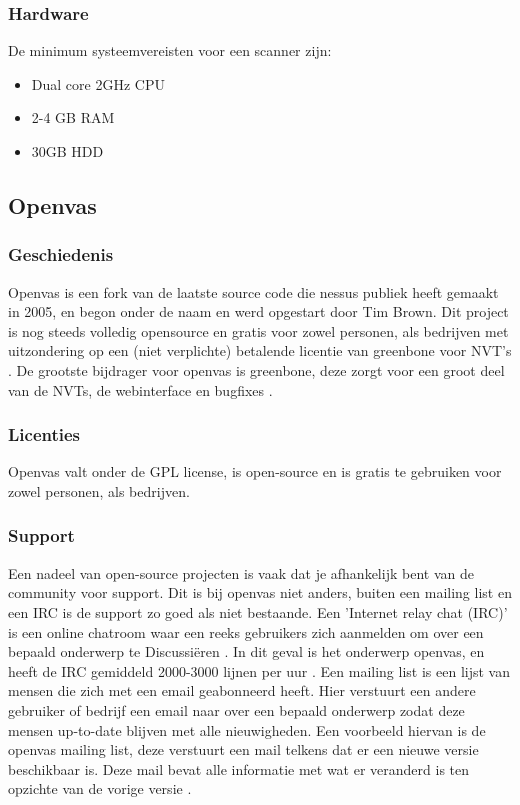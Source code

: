 \subsubsection{Hardware}
De minimum systeemvereisten voor een scanner zijn:

\begin{itemize}
\item Dual core 2GHz CPU
\item 2-4 GB RAM
\item 30GB HDD
\end{itemize}

\textcite{Nessus-requirements}


\subsection{Openvas}

\subsubsection{Geschiedenis}
Openvas is een fork van de laatste source code die nessus publiek heeft gemaakt in 2005, en begon onder de naam \textcite{Securiteam} en werd opgestart door Tim Brown. Dit project is nog steeds volledig opensource \textcite{Openvas-source} en gratis voor zowel personen, als bedrijven met uitzondering op een (niet verplichte) betalende licentie van greenbone voor NVT's \textcite{Openvas-nvt}. De grootste bijdrager voor openvas is greenbone, deze zorgt voor een groot deel van de NVTs, de webinterface en bugfixes \textcite{Openvas-contributors}.

\subsubsection{Licenties}

Openvas valt onder de GPL license, is open-source en is gratis te gebruiken voor zowel personen, als bedrijven.

\subsubsection{Support}

Een nadeel van open-source projecten is vaak dat je afhankelijk bent van de community voor support. Dit is bij openvas niet anders, buiten een mailing list en een IRC is de support zo goed als niet bestaande. Een 'Internet relay chat (IRC)' is een online chatroom waar een reeks gebruikers zich aanmelden om over een bepaald onderwerp te Discussiëren \textcite{IRC}. In dit geval is het onderwerp openvas, en heeft de IRC gemiddeld 2000-3000 lijnen per uur \textcite{Openvas-IRC}. Een mailing list is een lijst van mensen die zich met een email geabonneerd heeft. Hier verstuurt een andere gebruiker of bedrijf een email naar over een bepaald onderwerp zodat deze mensen up-to-date blijven met alle nieuwigheden. Een voorbeeld hiervan is de openvas mailing list, deze verstuurt een mail telkens dat er een nieuwe versie beschikbaar is. Deze mail bevat alle informatie met wat er veranderd is ten opzichte van de vorige versie \textcite{techtarget-mailinglist}.


